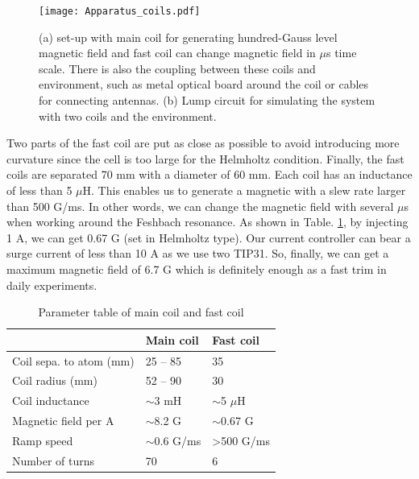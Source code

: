 \begin{figure}[htbp]
\begin{center}
\texttt{[image: Apparatus\_coils.pdf]}
\end{center}
\caption[Fast coil, main coil and environment]{(a) set-up with main coil for generating hundred-Gauss level magnetic field and fast coil can change magnetic field in $\mu$s time scale. There is also the coupling between these coils and environment, such as metal optical board around the coil or cables for connecting antennas. (b) Lump circuit for simulating the system with two coils and the environment.}
\label{Apparatus_coils}
\end{figure}

Two parts of the fast coil are put as close as possible to avoid introducing more curvature since the cell is too large for the Helmholtz condition. Finally, the fast coils are separated 70 mm with a diameter of 60 mm. Each coil has an inductance of less than 5 $\mu$H. This enables us to generate a magnetic with a slew rate larger than 500 G/ms. In other words, we can change the magnetic field with several $\mu$s when working around the Feshbach resonance. As shown in Table. \ref{tab:coils}, by injecting 1 A, we can get 0.67 G (set in Helmholtz type). Our current controller can bear a surge current of less than 10 A as we use two TIP31. So, finally, we can get a maximum magnetic field of 6.7 G which is definitely enough as a fast trim in daily experiments.


\begin{table}[htbp]
\centering
\begin{tabular}{|l|l|l|}
\hline
                        & Main coil      & Fast coil             \\ \hline
Coil sepa. to atom (mm) & 25 – 85        & 35                    \\ \hline
Coil radius (mm)        & 52 – 90        & 30                    \\ \hline
Coil inductance         & $\sim$3 mH     & $\sim$5 $\mu$H        \\ \hline
Magnetic field per A    & $\sim$8.2 G    & $\sim$0.67 G          \\ \hline
Ramp speed              & $\sim$0.6 G/ms & \textgreater{}500 G/ms\\ \hline
Number of turns         & 70             & 6                     \\ \hline
\end{tabular}
\caption[Parameter table of main coil and fast coil]{Parameter table of main coil and fast coil}
\label{tab:coils}
\end{table}

